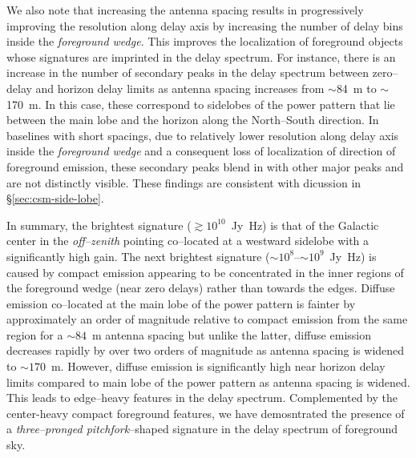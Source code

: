 \documentclass[preprint2,iop,numberedappendix]{emulateapj}
\begin{document}
We also note that increasing the antenna spacing results in progressively improving the resolution along delay axis by increasing the number of delay bins inside the {\it foreground wedge}. This improves the localization of foreground objects whose signatures are imprinted in the delay spectrum. For instance, there is an increase in the number of secondary peaks in the delay spectrum between zero--delay and horizon delay limits as antenna spacing increases from $\sim$84~m to $\sim$170~m. In this case, these correspond to sidelobes of the power pattern that lie between the main lobe and the horizon along the North--South direction. In baselines with short spacings, due to relatively lower resolution along delay axis inside the {\it foreground wedge} and a consequent loss of localization of direction of foreground emission, these secondary peaks blend in with other major peaks and are not distinctly visible. These findings are consistent with dicussion in \S\ref{sec:csm-side-lobe}.

In summary, the brightest signature ($\gtrsim 10^{10}$~Jy~Hz) is that of the Galactic center in the {\it off--zenith} pointing co--located at a westward sidelobe with a significantly high gain. The next brightest signature ($\sim 10^8$--$\sim 10^9$~Jy~Hz) is caused by compact emission appearing to be concentrated in the inner regions of the foreground wedge (near zero delays) rather than towards the edges. Diffuse emission co--located at the main lobe of the power pattern is fainter by approximately an order of magnitude relative to compact emission from the same region for a $\sim 84$~m antenna spacing but unlike the latter, diffuse emission decreases rapidly by over two orders of magnitude as antenna spacing is widened to $\sim 170$~m. However, diffuse emission is significantly high near horizon delay limits compared to main lobe of the power pattern as antenna spacing is widened. This leads to edge--heavy features in the delay spectrum. Complemented by the center-heavy compact foreground features, we have demosntrated the presence of a {\it three--pronged pitchfork}--shaped signature in the delay spectrum of foreground sky.

\end{document}
